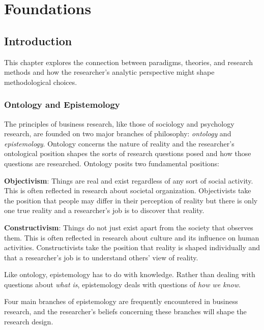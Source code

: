 \documentclass[]{book}
\theoremstyle{definition}
\theoremstyle{definition}
\theoremstyle{definition}
\theoremstyle{remark}
\begin{document}
\hypertarget{foundations}{%
\chapter{Foundations}\label{foundations}}

\hypertarget{introduction-1}{%
\section{Introduction}\label{introduction-1}}

This chapter explores the connection between paradigms, theories, and
research methods and how the researcher's analytic perspective might
shape methodological choices.

\hypertarget{ontology-and-epistemology}{%
\subsection{Ontology and Epistemology}\label{ontology-and-epistemology}}

The principles of business research, like those of sociology and
psychology research, are founded on two major branches of philosophy:
\emph{ontology} and \emph{epistemology}. Ontology concerns the nature of
reality and the researcher's ontological position shapes the sorts of
research questions posed and how those questions are researched.
Ontology posits two fundamental positions:

\textbf{Objectivism}: Things are real and exist regardless of any sort
of social activity. This is often reflected in research about societal
organization. Objectivists take the position that people may differ in
their perception of reality but there is only one true reality and a
researcher's job is to discover that reality.

\textbf{Constructivism}: Things do not just exist apart from the society
that observes them. This is often reflected in research about culture
and its influence on human activities. Constructivists take the position
that reality is shaped individually and that a researcher's job is to
understand others' view of reality.

Like ontology, epistemology has to do with knowledge. Rather than
dealing with questions about \emph{what is}, epistemology deals with
questions of \emph{how we know}.

Four main branches of epistemology are frequently encountered in
business research, and the researcher's beliefs concerning these
branches will shape the research design.
\end{document}
